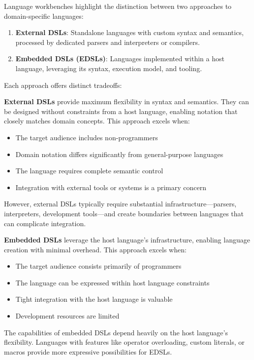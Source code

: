 \documentclass[11pt]{article}
\begin{document}
Language workbenches highlight the distinction between two approaches to domain-specific languages:

\begin{enumerate}
\item \textbf{External DSLs}: Standalone languages with custom syntax and semantics, processed by dedicated parsers and interpreters or compilers.

\item \textbf{Embedded DSLs (EDSLs)}: Languages implemented within a host language, leveraging its syntax, execution model, and tooling.
\end{enumerate}

Each approach offers distinct tradeoffs:

\textbf{\textbf{External DSLs}} provide maximum flexibility in syntax and semantics. They can be designed without constraints from a host language, enabling notation that closely matches domain concepts. This approach excels when:

\begin{itemize}
\item The target audience includes non-programmers
\item Domain notation differs significantly from general-purpose languages
\item The language requires complete semantic control
\item Integration with external tools or systems is a primary concern
\end{itemize}

However, external DSLs typically require substantial infrastructure—parsers, interpreters, development tools—and create boundaries between languages that can complicate integration.

\textbf{\textbf{Embedded DSLs}} leverage the host language's infrastructure, enabling language creation with minimal overhead. This approach excels when:

\begin{itemize}
\item The target audience consists primarily of programmers
\item The language can be expressed within host language constraints
\item Tight integration with the host language is valuable
\item Development resources are limited
\end{itemize}

The capabilities of embedded DSLs depend heavily on the host language's flexibility. Languages with features like operator overloading, custom literals, or macros provide more expressive possibilities for EDSLs.
\end{document}
